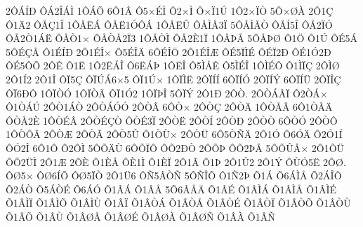 {2^^d4^^c1^^cd^^d0
^^d4^^c12^^ce^^c1^^cc
1^^d4^^c1^^d5
6^^d41^^c2
^^d45^^d7^^c9^^cc
^^d42^^d7^^cc
^^d4^^d7^^cf1^^da
1^^d42^^d7^^cf^^d2
5^^d4^^d7^^d8^^c0
2^^d41^^c7
^^d41^^c42
^^d4^^c5^^c71^^ce
1^^d4^^c5^^cb^^c1
^^d4^^c5^^cb1^^d3^^d4^^c1
1^^d4^^c5^^cb^^db
^^d4^^c5^^cc^^c53^^cf
5^^d4^^c5^^cc^^c5^^d2
^^d4^^c5^^cd5^^ce
^^d4^^c52^^cf^^d3
^^d4^^c52^^d21^^c1^^cb
^^d4^^c5^^d21^^d7
^^d4^^c5^^d2^^c52^^cf3
1^^d4^^c5^^d2^^cc
^^d4^^c52^^c81^^cf
1^^d4^^c5^^de^^c5
5^^d4^^c5^^de^^d8
^^d41^^d6
^^d41^^da
^^d4^^c95^^c1
5^^d4^^c9^^c7^^c5
^^d41^^c9^^cd^^d0
2^^d41^^c9^^ce^^d7
^^d45^^c9^^ce^^c4
6^^d4^^c9^^ce^^d6
2^^d41^^c9^^ce^^c6
^^d4^^c95^^cf^^cc^^c9
^^d4^^c9^^cf2^^d0
^^d4^^c91^^d32^^d0
^^d4^^c95^^d4^^d5
2^^d4^^ca
^^d41^^cb
1^^d42^^cb^^c1^^ce
^^d46^^cb^^c1^^de
1^^d4^^cb^^ce
^^d45^^cc^^c5^^ca
^^d45^^cc^^c9^^ce
1^^d4^^cc^^c9^^d4
^^d41^^cc^^cf^^c7
2^^d4^^cc^^d8
2^^d41^^cd2
2^^d41^^ce
^^d4^^cf5^^c7
^^d4^^cf^^da^^c16^^d75
^^d4^^cf1^^da^^d7
1^^d4^^cf^^cc^^cb
2^^d4^^cf^^cd^^cd
6^^d4^^cf^^cd^^d3
2^^d4^^cf^^cd^^dd
6^^d4^^cf^^cd^^dc
2^^d4^^cf^^ce^^c7
^^d4^^cf6^^d0^^d4
1^^d4^^cf^^d2^^d3
1^^d4^^cf^^d2^^c3
^^d4^^cf1^^d32
1^^d4^^cf^^de^^ce
5^^d4^^cf^^dd
2^^d41^^d0
2^^d4^^d2.
2^^d4^^d2^^c1^^c2^^cf
^^d42^^d2^^c1^^d7
^^d41^^d2^^c1^^da
2^^d4^^d21^^c1^^d2
2^^d4^^d2^^c1^^d3^^d3
2^^d4^^d2^^c2
6^^d4^^d2^^d7
2^^d4^^d2^^c7
2^^d4^^d2^^c4
1^^d4^^d2^^c5^^c2
6^^d41^^d2^^c5^^c4
^^d4^^d2^^c52^^c8
1^^d4^^d2^^c9^^c2
2^^d4^^d2^^c9^^c7^^d2
^^d4^^d2^^c93^^cf
2^^d4^^d2^^cb
2^^d4^^d2^^cd
2^^d4^^d2^^d0
2^^d4^^d2^^d2
6^^d4^^d2^^d3
2^^d4^^d2^^d4
1^^d4^^d2^^d5^^c2
2^^d4^^d2^^c6
2^^d4^^d2^^c3
2^^d4^^d25^^db
^^d41^^d2^^d9^^d7
2^^d4^^d2^^dc
6^^d45^^d2^^d1^^c4
2^^d41^^d3
^^d46^^d3^^c4
^^d42^^d31^^cd
^^d4^^d32^^ce
6^^d41^^d4
^^d42^^d4^^cc
5^^d4^^d5^^c4^^d9
6^^d4^^d5^^cf^^d4
^^d4^^d52^^d0^^d2
2^^d4^^d5^^de
^^d4^^d52^^de^^c5
5^^d4^^d5^^db^^c5^^d7
2^^d41^^d5^^dc
^^d4^^d52^^dc^^cc
2^^d41^^c6
2^^d4^^c8
^^d41^^c8^^c5
^^d4^^c81^^cc
^^d41^^c8^^cf
2^^d41^^c3
^^d41^^de
2^^d41^^db2
2^^d41^^dd
^^d4^^d9^^d35^^cb
2^^d4^^d8.
^^d4^^d85^^d7
^^d4^^d86^^cd^^d5
^^d4^^d85^^cf^^d2
2^^d41^^dc6
^^d4^^d15^^c2^^d2^^d1
5^^d4^^d1^^ce^^d5
^^d41^^d12^^de
^^d51^^c1
^^d56^^c1^^cc^^c5
^^d52^^c1^^ce^^d4
^^d52^^c1^^d2
^^d55^^c1^^d2^^c9
^^d56^^c1^^d3
^^d51^^c2^^c1
^^d51^^c2^^c5
5^^d56^^c2^^c5^^c4
^^d51^^c2^^c9
^^d51^^c2^^cc^^c1
^^d51^^c2^^cc^^c5
^^d51^^c2^^cc^^c9
^^d51^^c2^^cc^^cf
^^d51^^c2^^cc^^d5
^^d51^^c2^^cc^^d9
^^d51^^c2^^cf
^^d51^^c2^^d2^^c1
^^d51^^c2^^d2^^c5
^^d51^^c2^^d2^^c9
^^d51^^c2^^d2^^cf
^^d51^^c2^^d2^^d5
^^d51^^c2^^d2^^d9
^^d51^^c2^^d5
^^d51^^c2^^d9
^^d51^^c2^^d8^^c5
^^d51^^c2^^d8^^c9
^^d51^^c2^^d8^^c0
^^d51^^c2^^d8^^d1
^^d51^^c2^^c0
^^d51^^c2^^d1
}
